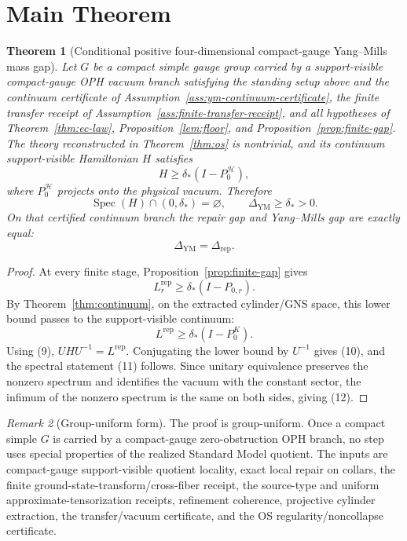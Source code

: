 \documentclass[11pt]{article}
\numberwithin{equation}{section}
\newtheorem{theorem}{Theorem}[section]
\theoremstyle{remark}
\newtheorem{remark}[theorem]{Remark}
\newcommand{\YM}{\mathrm{YM}}
\newcommand{\Rep}{\mathrm{rep}}
\newcommand{\Hcal}{\mathcal H}
\begin{document}
\section{Main Theorem}

\begin{theorem}[Conditional positive four-dimensional compact-gauge Yang--Mills mass gap]
\label{thm:main}
Let \(G\) be a compact simple gauge group carried by a support-visible compact-gauge OPH vacuum
branch satisfying the standing setup above and the continuum certificate of
Assumption~\ref{ass:ym-continuum-certificate}, the finite transfer receipt of
Assumption~\ref{ass:finite-transfer-receipt}, and all hypotheses of
Theorem~\ref{thm:ec-law}, Proposition~\ref{lem:floor}, and
Proposition~\ref{prop:finite-gap}. The theory reconstructed in
Theorem~\ref{thm:os}
is nontrivial, and its continuum support-visible Hamiltonian \(H\) satisfies
\[
H\ge \delta_*(I-P_0^{\Hcal}),
\tag{10}
\]
where \(P_0^{\Hcal}\) projects onto the physical vacuum. Therefore
\[
\operatorname{Spec}(H)\cap(0,\delta_*)=\varnothing,
\qquad
\Delta_{\YM}\ge \delta_*>0.
\tag{11}
\]
On that certified continuum branch the repair gap and Yang--Mills gap are exactly equal:
\[
\Delta_{\YM}=\Delta_{\mathrm{rep}}.
\tag{12}
\]
\end{theorem}

\begin{proof}
At every finite stage, Proposition~\ref{prop:finite-gap} gives
\[
L_r^{\Rep}\ge \delta_*(I-P_{0,r}).
\]
By Theorem~\ref{thm:continuum}, on the extracted cylinder/GNS space, this lower bound passes to
the support-visible continuum:
\[
L^{\mathrm{rep}}\ge \delta_*(I-P_0^K).
\]
Using (9), \(UHU^{-1}=L^{\mathrm{rep}}\). Conjugating the lower bound by \(U^{-1}\) gives (10),
and the spectral statement (11) follows. Since unitary equivalence preserves the nonzero spectrum
and identifies the vacuum with the constant sector, the infimum of the nonzero spectrum is the
same on both sides, giving (12).
\end{proof}

\begin{remark}[Group-uniform form]
The proof is group-uniform. Once a compact simple \(G\) is carried by a compact-gauge
zero-obstruction OPH branch, no step uses special properties of the realized Standard Model
quotient. The inputs are compact-gauge support-visible quotient locality, exact local repair on
collars, the finite ground-state-transform/cross-fiber receipt, the source-type and uniform
approximate-tensorization receipts, refinement coherence, projective cylinder extraction, the transfer/vacuum certificate,
and the OS regularity/noncollapse certificate.
\end{remark}
\end{document}
